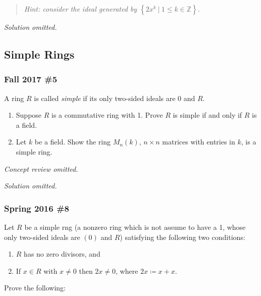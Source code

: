 \begin{quote}
\emph{Hint: consider the ideal generated by
\(\left\{{ 2x^k {~\mathrel{\Big\vert}~}1\leq k \in {\mathbb{Z}}}\right\}\).}
\end{quote}

\emph{Solution omitted.}

\hypertarget{simple-rings}{%
\subsection{Simple Rings}\label{simple-rings}}

\hypertarget{fall-2017-5}{%
\subsubsection{Fall 2017 \#5}\label{fall-2017-5}}

A ring \(R\) is called \emph{simple} if its only two-sided ideals are
\(0\) and \(R\).

\begin{enumerate}
\def\labelenumi{\alph{enumi}.}
\item
  Suppose \(R\) is a commutative ring with 1. Prove \(R\) is simple if
  and only if \(R\) is a field.
\item
  Let \(k\) be a field. Show the ring \(M_n (k)\), \(n \times n\)
  matrices with entries in \(k\), is a simple ring.
\end{enumerate}

\emph{Concept review omitted.}

\emph{Solution omitted.}

\hypertarget{spring-2016-8}{%
\subsubsection{Spring 2016 \#8}\label{spring-2016-8}}

Let \(R\) be a simple rng (a nonzero ring which is not assume to have a
1, whose only two-sided ideals are \((0)\) and \(R\)) satisfying the
following two conditions:

\begin{enumerate}
\def\labelenumi{\roman{enumi}.}
\tightlist
\item
  \(R\) has no zero divisors, and
\item
  If \(x\in R\) with \(x\neq 0\) then \(2x\neq 0\), where
  \(2x\coloneqq x+x\).
\end{enumerate}

Prove the following:

